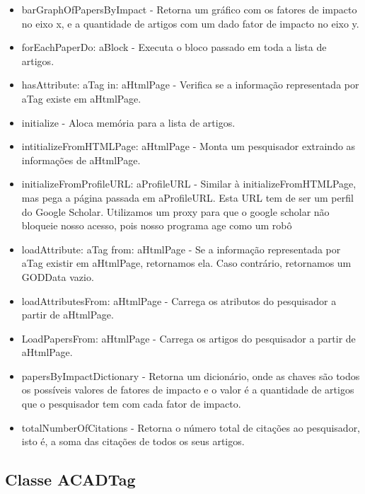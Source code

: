 \begin{itemize}
  \item barGraphOfPapersByImpact - Retorna um gráfico com os fatores de impacto no eixo x, e a quantidade de artigos com um  dado fator de impacto no eixo y.

  \item forEachPaperDo: aBlock - Executa o bloco passado em toda a lista de artigos.

  \item hasAttribute: aTag in: aHtmlPage - Verifica se a informação representada por aTag existe em aHtmlPage.

  \item initialize - Aloca memória para a lista de artigos.

  \item intitializeFromHTMLPage: aHtmlPage - Monta um pesquisador extraindo as informações de aHtmlPage.

  \item initializeFromProfileURL: aProfileURL - Similar à initializeFromHTMLPage, mas pega a página passada em aProfileURL. Esta URL tem de ser um perfil do Google Scholar. Utilizamos um proxy para que o google scholar não bloqueie nosso acesso, pois nosso programa age como um robô

  \item loadAttribute: aTag from: aHtmlPage - Se a informação representada por aTag existir em aHtmlPage, retornamos ela. Caso contrário, retornamos um GODData vazio.

  \item loadAttributesFrom: aHtmlPage - Carrega os atributos do pesquisador a partir de aHtmlPage.

  \item LoadPapersFrom: aHtmlPage - Carrega os artigos do pesquisador a partir de aHtmlPage.

  \item papersByImpactDictionary - Retorna um dicionário, onde as chaves são todos os possíveis valores de  fatores de impacto e o valor é a quantidade de artigos que o pesquisador tem com cada fator de impacto.

  \item totalNumberOfCitations - Retorna o número total de citações ao pesquisador, isto é, a soma das citações de todos os  seus artigos.

\end{itemize}

\subsection{Classe ACADTag}

